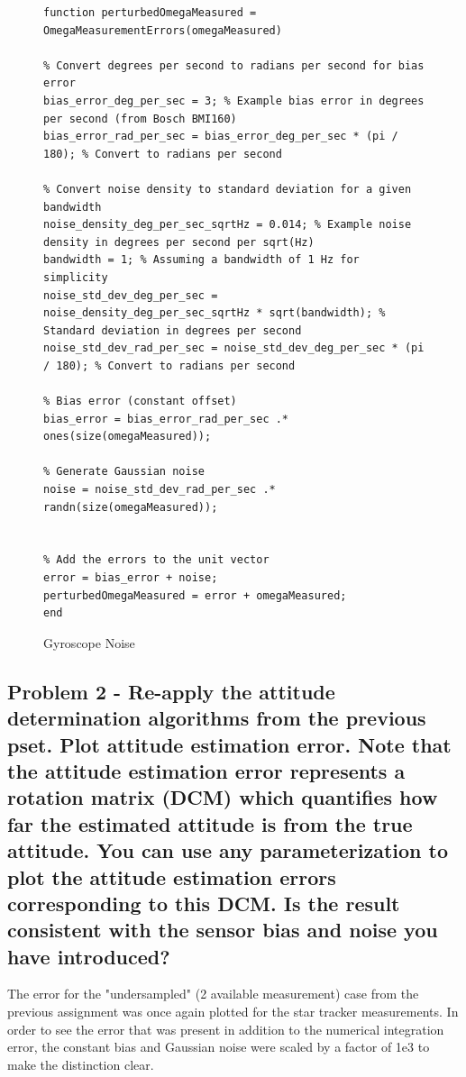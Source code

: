 \begin{figure} [H]
    \centering
    \begin{lstlisting}
function perturbedOmegaMeasured = OmegaMeasurementErrors(omegaMeasured)

% Convert degrees per second to radians per second for bias error
bias_error_deg_per_sec = 3; % Example bias error in degrees per second (from Bosch BMI160)
bias_error_rad_per_sec = bias_error_deg_per_sec * (pi / 180); % Convert to radians per second

% Convert noise density to standard deviation for a given bandwidth
noise_density_deg_per_sec_sqrtHz = 0.014; % Example noise density in degrees per second per sqrt(Hz)
bandwidth = 1; % Assuming a bandwidth of 1 Hz for simplicity
noise_std_dev_deg_per_sec = noise_density_deg_per_sec_sqrtHz * sqrt(bandwidth); % Standard deviation in degrees per second
noise_std_dev_rad_per_sec = noise_std_dev_deg_per_sec * (pi / 180); % Convert to radians per second

% Bias error (constant offset)
bias_error = bias_error_rad_per_sec .* ones(size(omegaMeasured));

% Generate Gaussian noise
noise = noise_std_dev_rad_per_sec .* randn(size(omegaMeasured));


% Add the errors to the unit vector
error = bias_error + noise;
perturbedOmegaMeasured = error + omegaMeasured;
end
    \end{lstlisting}
    \caption{Gyroscope Noise}
    \label{fig:gyroNoise}
\end{figure}

\subsection{Problem 2 - Re-apply the attitude determination algorithms from the previous pset. Plot attitude estimation error. Note that the attitude estimation error represents a rotation matrix (DCM) which quantifies how far the estimated
attitude is from the true attitude. You can use any parameterization to plot the attitude estimation errors corresponding to this DCM. Is the result consistent with the sensor bias and noise you have introduced?}

The error for the "undersampled" (2 available measurement) case from the previous assignment was once again plotted for the star tracker measurements. In order to see the error that was present in addition to the numerical integration error, the constant bias and Gaussian noise were scaled by a factor of 1e3 to make the distinction clear. 

